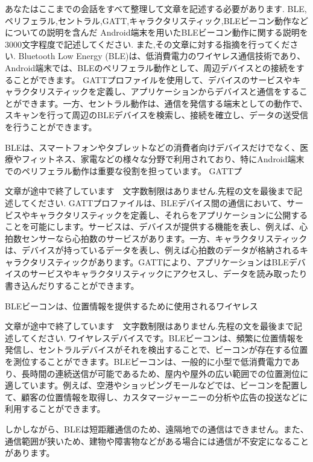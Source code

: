 あなたはここまでの会話をすべて整理して文章を記述する必要があります.
BLE,ペリフェラル,セントラル,GATT,キャラクタリスティック,BLEビーコン動作などについての説明を含んだ
Android端末を用いたBLEビーコン動作に関する説明を3000文字程度で記述してください.
また,その文章に対する指摘を行ってください.
Bluetooth Low Energy (BLE)は、低消費電力のワイヤレス通信技術であり、Android端末では、BLEのペリフェラル動作として、周辺デバイスとの接続をすることができます。 GATTプロファイルを使用して、デバイスのサービスやキャラクタリスティックを定義し、アプリケーションからデバイスと通信をすることができます。一方、セントラル動作は、通信を発信する端末としての動作で、スキャンを行って周辺のBLEデバイスを検索し、接続を確立し、データの送受信を行うことができます。

BLEは、スマートフォンやタブレットなどの消費者向けデバイスだけでなく、医療やフィットネス、家電などの様々な分野で利用されており、特にAndroid端末でのペリフェラル動作は重要な役割を担っています。 GATTプ





文章が途中で終了しています　文字数制限はありません.先程の文を最後まで記述してください.
GATTプロファイルは、BLEデバイス間の通信において、サービスやキャラクタリスティックを定義し、それらをアプリケーションに公開することを可能にします。サービスは、デバイスが提供する機能を表し、例えば、心拍数センサーなら心拍数のサービスがあります。一方、キャラクタリスティックは、デバイスが持っているデータを表し、例えば心拍数のデータが格納されるキャラクタリスティックがあります。GATTにより、アプリケーションはBLEデバイスのサービスやキャラクタリスティックにアクセスし、データを読み取ったり書き込んだりすることができます。

BLEビーコンは、位置情報を提供するために使用されるワイヤレス





文章が途中で終了しています　文字数制限はありません.先程の文を最後まで記述してください.
ワイヤレスデバイスです。BLEビーコンは、頻繁に位置情報を発信し、セントラルデバイスがそれを検出することで、ビーコンが存在する位置を測位することができます。BLEビーコンは、一般的に小型で低消費電力であり、長時間の連続送信が可能であるため、屋内や屋外の広い範囲での位置測位に適しています。例えば、空港やショッピングモールなどでは、ビーコンを配置して、顧客の位置情報を取得し、カスタマージャーニーの分析や広告の投送などに利用することができます。

しかしながら、BLEは短距離通信のため、遠隔地での通信はできません。また、通信範囲が狭いため、建物や障害物などがある場合には通信が不安定になることがあります。

